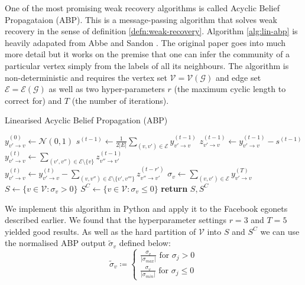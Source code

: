 \documentclass[]{article}
\newcommand{\Gaussian}{\mathcal{N}}
\newcommand{\Gcal}{\mathcal{G}}
\newcommand{\Vcal}{\mathcal{V}}
\newcommand{\Ecal}{\mathcal{E}}
\begin{document}
\begin{multicols*}{2}
One of the most promising weak recovery algorithms is called Acyclic Belief Propagataion (ABP). This is a message-passing algorithm that solves weak recovery in the sense of definition \ref{defn:weak-recovery}. Algorithm \ref{alg:lin-abp} is heavily adapated from Abbe and Sandon \cite{Linear-ABP}. The original paper goes into much more detail but it works on the premise that one can infer the community of a particular vertex simply from the labels of all its neighbours. The algorithm is non-deterministic and requires the vertex set $\Vcal = \Vcal(\Gcal)$ and edge set $\Ecal = \Ecal(\Gcal)$ as well as two hyper-parameters $r$ (the maximum cyclic length to correct for) and $T$ (the number of iterations).

%
\begin{algorithm}[H]
	\caption{Linearised Acyclic Belief Propagation (ABP)}
	\label{alg:lin-abp}
	\begin{algorithmic}
		\Function{ABP}{$\Ecal$, $\Vcal$, r, T}
		\State $y^{(0)}_{v' \rightarrow v} \gets \Gaussian(0, 1)$
		\For{$t \in \{1, 2 \cdots T\}$ and $(v, v') \in \Ecal$}
		\State $s^{(t-1)} \gets \frac{1}{2|E|} \sum_{(v, v') \in \Ecal} y^{(t-1)}_{v' \rightarrow v}$ 
		\State $z^{(t-1)}_{v' \rightarrow v} \gets y^{(t-1)}_{v' \rightarrow v} - s^{(t-1)}$ 
		\State $y^{(t)}_{v' \rightarrow v} \gets \sum_{(v', v'') \in \Ecal \setminus \{v\}}z^{(t-1)}_{v'' \rightarrow v'}$  \\
		\State $y^{(t)}_{v' \rightarrow v} \leftarrow y^{(t)}_{v' \rightarrow v} - \sum_{(v, v'') \in \Ecal \setminus \{v', v'''\}}z^{(t-r')}_{v'' \rightarrow v'}$
		\EndIf
		\EndFor
		\State $\sigma_v \gets \sum_{(v, v') \in \Ecal} y^{(T)}_{v' \rightarrow v}$ 
		\State $S \gets \{v \in \Vcal : \sigma_v > 0\}$ 
		\State $S^C \gets \{v \in \Vcal : \sigma_v \leq 0\}$
		\State \textbf{return} $S, S^C$
		\EndFunction
	\end{algorithmic}
\end{algorithm}

We implement this algorithm in Python and apply it to the Facebook egonets described earlier. We found that the hyperparameter settings $r=3$ and $T=5$ yielded good results. As well as the hard partition of $\Vcal$ into $S$ and $S^C$ we can use the normalised ABP output $\tilde{\sigma}_v$ defined below:
%
\begin{equation}
	\tilde{\sigma}_v \coloneqq \begin{cases}
		\frac{\sigma_v}{|\sigma_{max}|} \textrm{ for } \sigma_j > 0 \\
		\frac{\sigma_v}{|\sigma_{min}|} \textrm{ for } \sigma_j \leq 0
	\end{cases}
\end{equation}


\end{multicols*}
\end{document}
